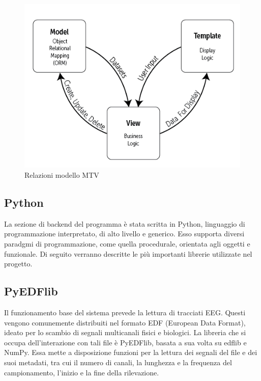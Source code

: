 \documentclass{article}
\begin{document}
\begin{figure}[!h]
\centering
\includegraphics[scale=0.5]{mtv}
\caption{Relazioni modello MTV}
\end{figure}

\subsection{Python}
La sezione di backend del programma è stata scritta in Python, linguaggio di programmazione interpretato, di alto livello e generico.
Esso supporta diversi paradgmi di programmazione, come quella procedurale, orientata agli oggetti e funzionale. 
Di seguito verranno descritte le più importanti librerie utilizzate nel progetto.

\subsection{PyEDFlib}
Il funzionamento base del sistema prevede la lettura di tracciati EEG. Questi vengono comunemente distribuiti nel formato EDF (European Data Format), ideato per lo scambio di segnali multicanali fisici e biologici. La libreria che si occupa dell'interazione con tali file è PyEDFlib, basata a sua volta su edflib e NumPy. Essa mette a disposizione funzioni per la lettura dei segnali del file e dei suoi metadati, tra cui il numero di canali, la lunghezza e la frequenza del campionamento, l'inizio e la fine della rilevazione. 
\end{document}
